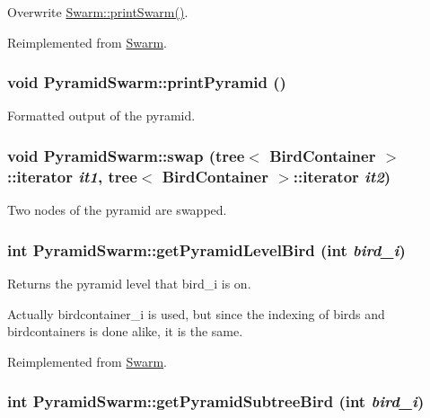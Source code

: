 Overwrite \hyperlink{classSwarm_3e480dd422f3babe42d22d5af097c2ba}{Swarm::printSwarm()}. 



Reimplemented from \hyperlink{classSwarm_3e480dd422f3babe42d22d5af097c2ba}{Swarm}.\hypertarget{classPyramidSwarm_6c186db55b8f8b65b5a598c6a45ae72e}{
\subsubsection{\setlength{\rightskip}{0pt plus 5cm}void PyramidSwarm::printPyramid ()}}
\label{classPyramidSwarm_6c186db55b8f8b65b5a598c6a45ae72e}


Formatted output of the pyramid. 

\hypertarget{classPyramidSwarm_c6d4a660c91549b01bb868f29a3570a9}{
\subsubsection{\setlength{\rightskip}{0pt plus 5cm}void PyramidSwarm::swap ({\bf tree}$<$ {\bf BirdContainer} $>$::iterator {\em it1}, \/  {\bf tree}$<$ {\bf BirdContainer} $>$::iterator {\em it2})}}
\label{classPyramidSwarm_c6d4a660c91549b01bb868f29a3570a9}


Two nodes of the pyramid are swapped. 

\hypertarget{classPyramidSwarm_756af67d13a153ab3d2581673733b474}{
\subsubsection{\setlength{\rightskip}{0pt plus 5cm}int PyramidSwarm::getPyramidLevelBird (int {\em bird\_\-i})}}
\label{classPyramidSwarm_756af67d13a153ab3d2581673733b474}


Returns the pyramid level that bird\_\-i is on. 

Actually birdcontainer\_\-i is used, but since the indexing of birds and birdcontainers is done alike, it is the same. 

Reimplemented from \hyperlink{classSwarm_98b6b325d8caffbc62010f80a229ad6c}{Swarm}.\hypertarget{classPyramidSwarm_c88d70f33dee3ffa27d63e2877c8a8ad}{
\subsubsection{\setlength{\rightskip}{0pt plus 5cm}int PyramidSwarm::getPyramidSubtreeBird (int {\em bird\_\-i})}}
\label{classPyramidSwarm_c88d70f33dee3ffa27d63e2877c8a8ad}


